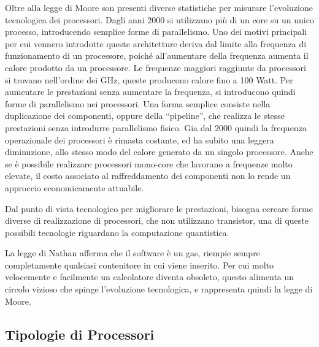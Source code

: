 \documentclass{article}
\numberwithin{equation}{subsection}
\begin{document}
Oltre alla legge di Moore son presenti diverse statistiche per misurare l'evoluzione tecnologica dei processori. Dagli anni 2000 si utilizzano più di un core su un unico 
processo, introducendo semplice forme di parallelismo. Uno dei motivi principali per cui vennero introdotte queste architetture deriva dal limite alla frequenza di funzionamento 
di un processore, poiché all'aumentare della frequenza aumenta il calore prodotto da un processore. Le frequenze maggiori raggiunte da processori si trovano nell'ordine dei 
GHz, queste producono calore fino a 100 Watt. Per aumentare le prestazioni senza aumentare la frequenza, si introducono quindi forme di parallelismo nei processori. Una forma 
semplice consiste nella duplicazione dei componenti, oppure della ``pipeline'', che realizza le stesse prestazioni senza introdurre parallelismo fisico. 
Gia dal 2000 quindi la frequenza operazionale dei processori è rimasta costante, ed ha subito una leggera diminuzione, allo stesso modo del calore generato da un singolo 
processore. Anche se è possibile realizzare processori mono-core che lavorano a frequenze molto elevate, il costo associato al raffreddamento dei componenti non lo rende un 
approccio economicamente attuabile. 

Dal punto di vista tecnologico per migliorare le prestazioni, bisogna cercare forme diverse di realizzazione di processori, che non utilizzano transistor, una di queste possibili 
tecnologie riguardano la computazione quantistica. 


La legge di Nathan afferma che il software è un gas, riempie sempre completamente qualsiasi contenitore in cui viene inserito. Per cui molto velocemente e facilmente un 
calcolatore diventa obsoleto, questo alimenta un circolo vizioso che spinge l'evoluzione tecnologica, e rappresenta quindi la legge di Moore. 

\subsection{Tipologie di Processori}
\end{document}
